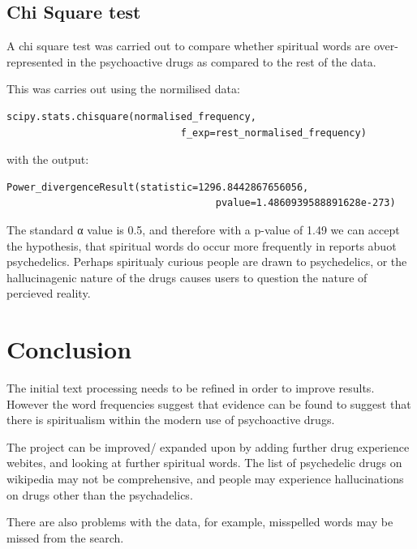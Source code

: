 \documentclass{article}
\begin{document}
\subsection{Chi Square test}

A chi square test was carried out to compare whether spiritual words are over-represented in the psychoactive drugs as compared to the rest of the data. 

This was carries out using the normilised data:

\begin{lstlisting}
scipy.stats.chisquare(normalised_frequency,
                              f_exp=rest_normalised_frequency)
\end{lstlisting}
with the output:

\begin{lstlisting}
Power_divergenceResult(statistic=1296.8442867656056,
                                    pvalue=1.4860939588891628e-273)
\end{lstlisting}

The standard α value is 0.5, and therefore with a p-value of 1.49 we can accept the hypothesis, that spiritual words do occur more frequently in reports abuot psychedelics. Perhaps spiritualy curious people are drawn to psychedelics, or the hallucinagenic nature of the drugs causes users to question the nature of percieved reality. 

\section{Conclusion}

The initial text processing needs to be refined in order to improve results. However the word frequencies suggest that evidence can be found to suggest that there is spiritualism within the modern use of psychoactive drugs.

The project can be improved/ expanded upon by adding further drug experience webites, and looking at further spiritual words. The list of psychedelic drugs on wikipedia may not be comprehensive, and people may experience hallucinations on drugs other than the psychadelics. 

There are also problems with the data, for example, misspelled words may be missed from the search. 





\end{document}
